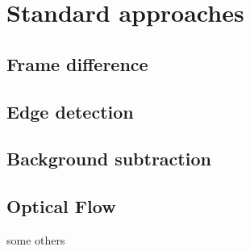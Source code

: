 \chapter{Standard approaches}

\section{Frame difference}
\section{Edge detection}
\section{Background subtraction}
\section{Optical Flow}

some others